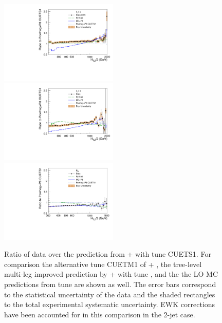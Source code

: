\begin{figure}[!htbp]
\begin{center}
  \includegraphics[width=0.5\textwidth]{Plots_HT_2_150/Comparison_data_MC_samples_2_Pow_EWK.pdf}%
  \includegraphics[width=0.5\textwidth]{Plots_HT_2_150/Comparison_data_MC_samples_3_Pow.pdf}\\
  \includegraphics[width=0.5\textwidth]{Plots_HT_2_150/Comparison_data_MC_samples_ratio_32_Pow.pdf}\\
  \caption{Ratio of data over the prediction from \POWHEG + \PYTHIAE
    with tune CUETS1. For comparison the alternative tune CUETM1 of
    \POWHEG + \PYTHIAE, the tree-level multi-leg improved prediction
    by \MadGraphF + \PYTHIAS with tune \Ztwostar, and the the LO MC
    predictions from \PYTHIAS tune \Ztwostar are shown as well. The
    error bars correspond to the statistical uncertainty of the data
    and the shaded rectangles to the total experimental systematic
    uncertainty. EWK corrections have been accounted for in this
    comparison in the 2-jet case.}
  \label{fig:data_MC}
\end{center}  
\end{figure}

